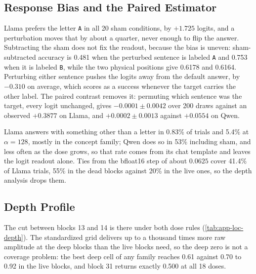 \subsection{Response Bias and the Paired Estimator}
\label{app:loc-bias}

Llama prefers the letter \texttt{A} in all 20 sham conditions, by $+1.725$
logits, and a perturbation moves that by about a quarter, never enough to flip
the answer. Subtracting the sham does not fix the readout, because the bias is
uneven: sham-subtracted accuracy is 0.481 when the perturbed sentence is
labeled \texttt{A} and 0.753 when it is labeled \texttt{B}, while the two
physical positions give 0.6178 and 0.6164. Perturbing either sentence pushes
the logits away from the default answer, by $-0.310$ on average, which scores
as a success whenever the target carries the other label. The paired contrast
removes it: permuting which sentence was the target, every logit unchanged,
gives $-0.0001\pm0.0042$ over 200 draws against an observed $+0.3877$ on
Llama, and $+0.0002\pm0.0013$ against $+0.0554$ on Qwen.

Llama answers with something other than a letter in 0.83\% of trials and 5.4\%
at $\alpha=128$, mostly in the concept family; Qwen does so in 53\% including
sham, and less often as the dose grows, so that rate comes from its chat
template and leaves the logit readout alone. Ties from the bfloat16 step of
about $0.0625$ cover 41.4\% of Llama trials, 55\% in the dead blocks against
20\% in the live ones, so the depth analysis drops them.

\subsection{Depth Profile}
\label{app:loc-depth}

The cut between blocks 13 and 14 is there under both dose rules
(\cref{tab:app-loc-depth}). The standardized grid delivers up to a thousand
times more raw amplitude at the deep blocks than the live blocks need, so the
deep zero is not a coverage problem: the best deep cell of any family reaches
0.61 against 0.70 to 0.92 in the live blocks, and block 31 returns exactly
0.500 at all 18 doses.

